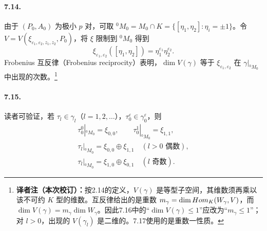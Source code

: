 \paragraph*{7.14.} 由于 $(P_0,A_0)$ 为极小 $p$ 对，可取 ${}^0M_0=M_0\cap K=\{[\eta_1,\eta_2]:\eta_i=\pm1\}$。令 $V=V(\xi_{\varepsilon_1,\varepsilon_2,z_1,z_2},P_0)$，将 $\xi$ 限制到 ${}^0M_0$ 得到
\[
 \xi_{\varepsilon_1,\varepsilon_2}([\eta_1,\eta_2])=\eta_1^{\varepsilon_1}\eta_2^{\varepsilon_2}.
\]
Frobenius 互反律（Frobenius reciprocity）表明，$\dim V(\gamma)$ 等于 $\xi_{\varepsilon_1,\varepsilon_2}$ 在 $\gamma|_{{}^0M_0}$ 中出现的次数。\footnote{\textbf{译者注（本次校订）：}按2.14的定义，$V(\gamma)$ 是等型子空间，其维数须再乘以该不可约 $K$ 型的维数。互反律给出的是重数 $m_\gamma=\dim Hom_K(W_\gamma,V)$，而 $\dim V(\gamma)=m_\gamma\dim W_\gamma$。因此7.16中的“$\dim V(\gamma)\le1$”应改为“$m_\gamma\le1$”；对 $l>0$，出现的 $V(\gamma_l)$ 是二维的。7.17使用的是重数一性质。}
\paragraph*{7.15.} 读者可验证，若 $\tau_l\in\gamma_l$（$l=1,2,\ldots$），$\tau_0^\varepsilon\in\gamma_0^\varepsilon$，则
\[
 \begin{gathered}
 \tau_0^0|_{{}^0M_0}=\xi_{0,0},\qquad\tau_0^1|_{{}^0M_0}=\xi_{1,1},\\
 \tau_l|_{{}^0M_0}=\xi_{0,0}\oplus\xi_{1,1}\quad(l>0\text{ 偶数}),\\
 \tau_l|_{{}^0M_0}=\xi_{1,0}\oplus\xi_{0,1}\quad(l\text{ 奇数}).
 \end{gathered}
\]
